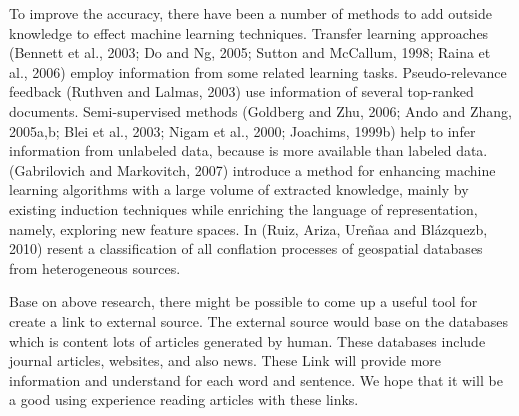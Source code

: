 \documentclass[a4paper,twocolumn]{article} %
\begin{document}
To improve the accuracy, there have been a number of methods to add outside knowledge to effect machine learning techniques. Transfer learning approaches (Bennett et al., 2003; Do and Ng, 2005; Sutton and McCallum, 1998; Raina et al., 2006) employ information from some related learning tasks. Pseudo-relevance feedback (Ruthven and Lalmas, 2003) use information of several top-ranked documents. Semi-supervised methods (Goldberg and Zhu, 2006; Ando and Zhang, 2005a,b; Blei et al., 2003; Nigam et al., 2000; Joachims, 1999b) help to infer information from unlabeled data, because is more available than labeled data. (Gabrilovich and  Markovitch, 2007) introduce a method for enhancing machine learning algorithms with a large volume of extracted knowledge, mainly by existing induction techniques while enriching the language of representation, namely, exploring new feature spaces. In (Ruiz, Ariza, Ureñaa and Blázquezb, 2010) resent a classification of all conflation processes of geospatial databases from heterogeneous sources.

Base on above research, there might be possible to come up a useful tool for create a link to external source. The external source would base on the databases which is content lots of articles  generated by human. These databases include journal articles, websites, and also news. These Link will provide more information and understand for each word and sentence. We hope that it will be a good using experience reading articles with these links.
\end{document}
